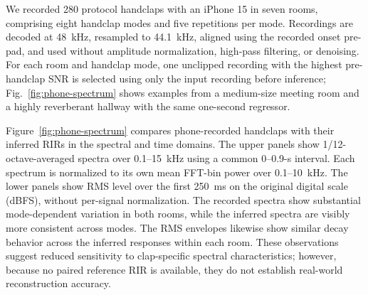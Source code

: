\documentclass{article}
\begin{document}

We recorded 280 protocol handclaps with an iPhone 15 in seven rooms, comprising
eight handclap modes and five repetitions per mode. Recordings are decoded at
48~kHz, resampled to 44.1~kHz, aligned using the recorded onset pre-pad, and
used without amplitude normalization, high-pass filtering, or denoising. For
each room and handclap mode, one unclipped recording with the highest
pre-handclap SNR is selected using only the input recording before inference;
Fig.~\ref{fig:phone-spectrum} shows examples from a medium-size meeting room
and a highly reverberant hallway with the same one-second regressor.

Figure~\ref{fig:phone-spectrum} compares phone-recorded handclaps with their
inferred RIRs in the spectral and time domains. The upper panels show
1/12-octave-averaged spectra over 0.1--15~kHz using a common 0--0.9-s
interval. Each spectrum is normalized to its own mean FFT-bin power over
0.1--10~kHz. The lower panels show RMS level over the first 250~ms on the
original digital scale (dBFS), without per-signal normalization.
The recorded spectra show substantial mode-dependent variation in both rooms,
while the inferred spectra are visibly more consistent across modes. The RMS
envelopes likewise show similar decay behavior across the inferred responses
within each room. These observations suggest reduced sensitivity to
clap-specific spectral characteristics; however, because no paired reference
RIR is available, they do not establish real-world reconstruction accuracy.





\end{document}
